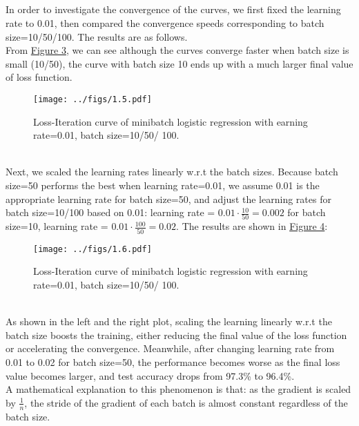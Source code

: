 \documentclass{article}
\begin{document}
        \subsection{}
        In order to investigate the convergence of the curves, we first fixed the learning rate to 0.01,
        then compared the convergence speeds corresponding to batch size=10/50/100. The results are as follows.\\
        From \hyperref[fig:1.5]{Figure 3}, we can see although the curves converge faster when batch size is small (10/50),
        the curve with batch size 10 ends up with a much larger final value of loss function. \\
        \begin{figure}[hbt!]
            \centering
            \texttt{[image: ../figs/1.5.pdf]}
            \caption{Loss-Iteration curve of minibatch logistic regression with earning rate=0.01,
            batch size=10/50/ 100.}
            \label{fig:1.5}
        \end{figure}\\
        Next, we scaled the learning rates linearly w.r.t the batch sizes. Because batch size=50 performs the best when learning rate=0.01,
        we assume 0.01 is the appropriate learning rate for batch size=50, and adjust the learning rates for batch size=10/100 based on 0.01:
        learning rate = $0.01\cdot\frac{10}{50}=0.002$ for batch size=10, learning rate = $0.01\cdot\frac{100}{50}=0.02$. 
        The results are shown in \hyperref[fig:1.6]{Figure 4}:
        \begin{figure}[hbt!]
            \centering
            \texttt{[image: ../figs/1.6.pdf]}
            \caption{Loss-Iteration curve of minibatch logistic regression with earning rate=0.01,
            batch size=10/50/ 100.}
            \label{fig:1.6}
        \end{figure}\\
        As shown in the left and the right plot, scaling the learning linearly w.r.t the batch size boosts the training,
        either reducing the final value of the loss function or accelerating the convergence. 
        Meanwhile, after changing learning rate from 0.01 to 0.02 for batch size=50, 
        the performance becomes worse as the final loss value becomes larger, and test accuracy drops from 97.3\% to 96.4\%.\\
        A mathematical explanation to this phenomenon is that: as the gradient is scaled by $\frac{1}{n}$, 
        the stride of the gradient of each batch is almost constant regardless of the batch size. 
\end{document}
